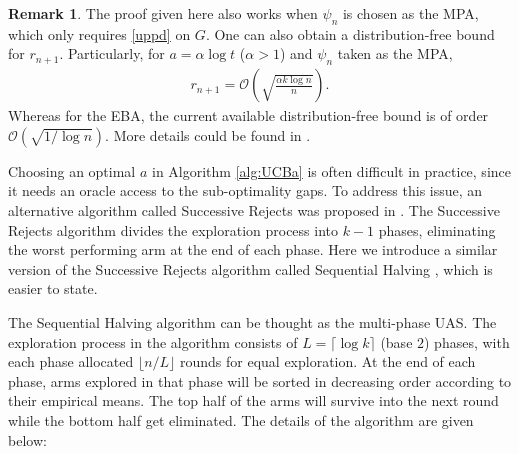 \documentclass[letterpaper,11pt,openright,openany]{book}
\numberwithin{equation}{section}
\theoremstyle{plain}
\theoremstyle{definition}
\newtheorem{Rem}[Th]{Remark}
\begin{document}
\begin{Rem}
The proof given here also works when $\psi_n$ is chosen as the MPA, which only requires \eqref{uppd} on $G$. One can also obtain a distribution-free bound for $r_{n+1}$. Particularly, for $a=\alpha\log t$ ($\alpha>1$) and $\psi_n$ taken as the MPA, 
\begin{align*}
r_{n+1}=\mathcal O\left(\sqrt{\frac{\alpha k\log n}{n}}\right). 
\end{align*} 
Whereas for the EBA, the current available distribution-free bound is of order $\mathcal O(\sqrt{1/\log n})$. More details could be found in \cite{audibert2010best}. 
\end{Rem}

Choosing an optimal $a$ in Algorithm \ref{alg:UCBa} is often difficult in practice, since it needs an oracle access to the sub-optimality gaps. To address this issue, an alternative algorithm called Successive Rejects was proposed in \cite{audibert2010best}. The Successive Rejects algorithm divides the exploration process into $k-1$ phases, eliminating the worst performing arm at the end of each phase. Here we introduce a similar version of the Successive Rejects algorithm called Sequential Halving \cite{lattimore2018bandit}, which is easier to state. 

The Sequential Halving algorithm can be thought as the multi-phase UAS. The exploration process in the algorithm consists of $L=\lceil\log k\rceil$ (base $2$) phases, with each phase allocated $\lfloor n/L\rfloor$ rounds for equal exploration. At the end of each phase, arms explored in that phase will be sorted in decreasing order according to their empirical means. The top half of the arms will survive into the next round while the bottom half get eliminated. The details of the algorithm are given below:

\end{document}
